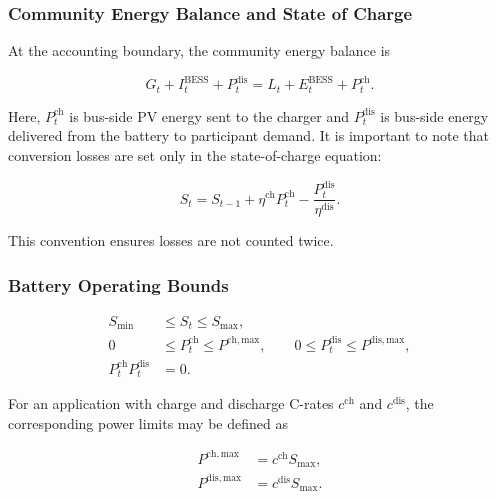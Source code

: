 \subsubsection{Community Energy Balance and State of Charge}
\label{subsec:bess_community_energy_balance}

At the accounting boundary, the community energy balance is

\begin{equation}
\label{eq:bess_community_energy_balance}
G_t + I^{\mathrm{BESS}}_t + P^{\mathrm{dis}}_t
=
L_t + E^{\mathrm{BESS}}_t + P^{\mathrm{ch}}_t.
\end{equation}

Here, $P^{\mathrm{ch}}_t$ is bus-side PV energy sent to the charger and $P^{\mathrm{dis}}_t$ is bus-side energy delivered from the battery to participant demand. It is important to note that conversion losses are set only in the state-of-charge equation:

\begin{equation}
\label{eq:bess_soc_update}
S_t=S_{t-1}+\eta^{\mathrm{ch}}P^{\mathrm{ch}}_t-
\frac{P^{\mathrm{dis}}_t}{\eta^{\mathrm{dis}}}.
\end{equation}

This convention ensures losses are not counted twice.

\subsubsection{Battery Operating Bounds}
\label{subsec:battery_operating_bounds}

\begin{align}
S_{\min} &\leq S_t \leq S_{\max},\label{eq:soc_bounds}\\
0 &\leq P^{\mathrm{ch}}_t \leq P^{\mathrm{ch,max}},\qquad
0 \leq P^{\mathrm{dis}}_t \leq P^{\mathrm{dis,max}},\label{eq:power_bounds}\\
P^{\mathrm{ch}}_tP^{\mathrm{dis}}_t &=0.\label{eq:no_simultaneous_charge_discharge}
\end{align}

For an application with charge and discharge C-rates $c^{\mathrm{ch}}$ and $c^{\mathrm{dis}}$, the corresponding power limits may be defined as

\begin{align}
P^{\mathrm{ch,max}} &= c^{\mathrm{ch}}S_{\max},\label{eq:charge_power_from_c_rate}\\
P^{\mathrm{dis,max}} &= c^{\mathrm{dis}}S_{\max}.\label{eq:discharge_power_from_c_rate}
\end{align}

